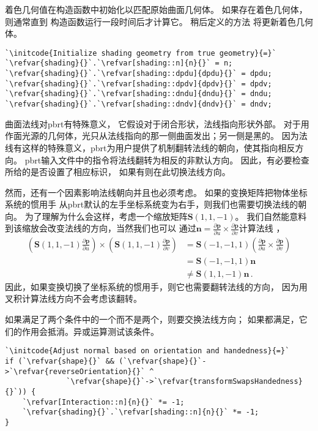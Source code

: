 着色几何值在构造函数中初始化以匹配原始曲面几何体。
如果存在着色几何体，则通常直到
构造函数运行一段时间后才计算它。
稍后定义的方法
将更新着色几何体。
\begin{lstlisting}
`\initcode{Initialize shading geometry from true geometry}{=}`
`\refvar{shading}{}`.`\refvar[shading::n]{n}{}` = n;
`\refvar{shading}{}`.`\refvar[shading::dpdu]{dpdu}{}` = dpdu;
`\refvar{shading}{}`.`\refvar[shading::dpdv]{dpdv}{}` = dpdv;
`\refvar{shading}{}`.`\refvar[shading::dndu]{dndu}{}` = dndu;
`\refvar{shading}{}`.`\refvar[shading::dndv]{dndv}{}` = dndv;
\end{lstlisting}

曲面法线对pbrt有特殊意义，
它假设对于闭合形状，法线指向形状外部。
对于用作面光源的几何体，光只从法线指向的那一侧曲面发出；另一侧是黑的。
因为法线有这样的特殊意义，pbrt为用户提供了机制翻转法线的朝向，使其指向相反方向。
pbrt输入文件中的指令将法线翻转为相反的非默认方向。
因此，有必要检查所给的是否设置了相应标识，
如果有则在此切换法线方向。

然而，还有一个因素影响法线朝向并且也必须考虑。
如果的变换矩阵把物体坐标系统的惯用手
从pbrt默认的左手坐标系统变为右手，则我们也需要切换法线的朝向。
为了理解为什么会这样，考虑一个缩放矩阵$\bm S(1,1,-1)$。
我们自然能意料到该缩放会改变法线的方向，当然我们也可以
通过$\displaystyle\bm n=\frac{\partial\bm p}{\partial u}\times\frac{\partial\bm p}{\partial v}$计算法线
，
\begin{align*}
    \left(\bm S(1,1,-1)\frac{\partial\bm p}{\partial u}\right)\times\left(\bm S(1,1,-1)\frac{\partial\bm p}{\partial v}\right) & =\bm S(-1,-1,1)\left(\frac{\partial\bm p}{\partial u}\times\frac{\partial\bm p}{\partial v}\right) \\
                                                                                                                               & =\bm S(-1,-1,1)\bm n                                                                               \\
                                                                                                                               & \neq \bm S(1,1,-1)\bm n\, .
\end{align*}
因此，如果变换切换了坐标系统的惯用手，则它也需要翻转法线的方向，
因为用叉积计算法线方向不会考虑该翻转。

如果满足了两个条件中的一个而不是两个，则要交换法线方向；
如果都满足，它们的作用会抵消。异或运算测试该条件。
\begin{lstlisting}
`\initcode{Adjust normal based on orientation and handedness}{=}`
if (`\refvar{shape}{}` && (`\refvar{shape}{}`->`\refvar{reverseOrientation}{}` ^
              `\refvar{shape}{}`->`\refvar{transformSwapsHandedness}{}`)) {
    `\refvar[Interaction::n]{n}{}` *= -1;
    `\refvar{shading}{}`.`\refvar[shading::n]{n}{}` *= -1;
}
\end{lstlisting}

